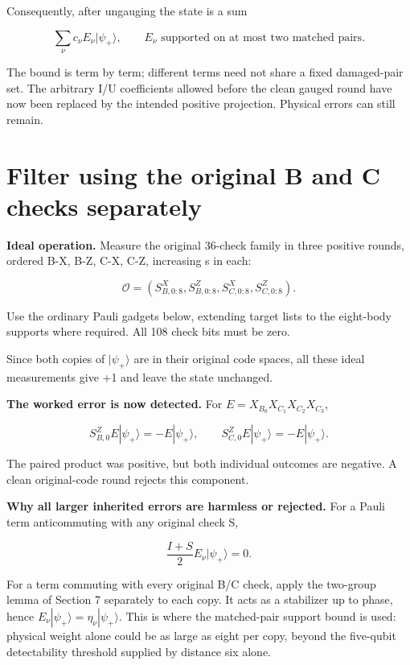 \documentclass[11pt]{article}
\begin{document}
Consequently, after ungauging the state is a sum

\[
\sum_\nu c_\nu E_\nu|\psi_+\rangle,\qquad
E_\nu\text{ supported on at most two matched pairs}.
\]

The bound is term by term; different terms need not share a fixed damaged-pair set. The arbitrary I/U coefficients allowed before the clean gauged round have now been replaced by the intended positive projection. Physical errors can still remain.

\section{Filter using the original B and C checks separately}
\textbf{Ideal operation.} Measure the original 36-check family in three positive rounds, ordered B-X, B-Z, C-X, C-Z, increasing s in each:

\[
\mathcal O=(S^X_{B,0:8},S^Z_{B,0:8},S^X_{C,0:8},S^Z_{C,0:8}).
\]

Use the ordinary Pauli gadgets below, extending target lists to the eight-body supports where required. All 108 check bits must be zero.

\begin{center}\begin{minipage}{\linewidth}

\end{minipage}\end{center}

Since both copies of \(|\psi_+\rangle\) are in their original code spaces, all these ideal measurements give +1 and leave the state unchanged.

\textbf{The worked error is now detected.} For \(E=X_{B_0}X_{C_1}X_{C_2}X_{C_3}\),

\[
S^Z_{B,0}E|\psi_+\rangle=-E|\psi_+\rangle,\qquad
S^Z_{C,0}E|\psi_+\rangle=-E|\psi_+\rangle.
\]

The paired product was positive, but both individual outcomes are negative. A clean original-code round rejects this component.

\textbf{Why all larger inherited errors are harmless or rejected.} For a Pauli term anticommuting with any original check S,

\[
\frac{I+S}{2}E_\nu|\psi_+\rangle=0.
\]

For a term commuting with every original B/C check, apply the two-group lemma of Section 7 separately to each copy. It acts as a stabilizer up to phase, hence \(E_\nu|\psi_+\rangle=\eta_\nu|\psi_+\rangle\). This is where the matched-pair support bound is used: physical weight alone could be as large as eight per copy, beyond the five-qubit detectability threshold supplied by distance six alone.
\end{document}
